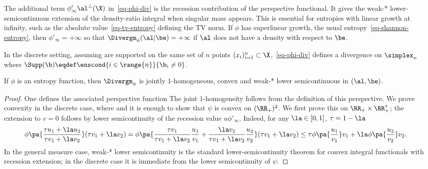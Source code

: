The additional term $\phi'_\infty \al^{\perp}(\X)$ in~\eqref{eq-phi-div} is the recession contribution of the perspective functional. It gives the weak-* lower-semicontinuous extension of the density-ratio integral when singular mass appears. This is essential for entropies with linear growth at infinity, such as the absolute value~\eqref{eq-tv-entropy} defining the TV norm. If $\phi$ has superlinear growth, \eg the usual entropy~\eqref{eq-shannon-entropy}, then $\phi'_\infty=+\infty$ so that $\Divergm_\phi (\al|\be) = +\infty$ if $\al$ does not have a density with respect to $\be$.

In the discrete setting, assuming
are supported on the same set of $n$ points $(x_i)_{i=1}^n \subset \X$,~\eqref{eq-phi-div} defines a divergence on $\simplex_n$
where $\Supp(\b) \eqdef \enscond{i \in \range{n}}{ \b_i \neq 0 }$.


\begin{proposition}
If $\phi$ is an entropy function, then $\Divergm_\phi$ is jointly $1$-homogeneous, convex and weak-* lower semicontinuous in $(\al,\be)$.
\end{proposition}

\begin{proof}
	One defines the associated perspective function
		The joint $1$-homogeneity follows from the definition of this perspective. We prove convexity in the discrete case, where
		and it is enough to show that $\psi$ is convex on $(\RR_+)^2$. We first prove this on $\RR_+ \times \RR_+^*$; the extension to $v=0$ follows by lower semicontinuity of the recession value $u\phi'_\infty$.
		Indeed, for any $\la \in [0,1]$, $\tau=1-\la$
	\begin{align*}
		\phi\pa{ \frac{\tau u_1 + \la u_2}{\tau v_1 + \la v_2} }
		(\tau v_1 + \la v_2)
		=
		\phi\pa{
				\frac{\tau v_1 }{\tau v_1 + \la v_2} \frac{u_1}{v_1}+
				\frac{\la v_2 }{\tau v_1 + \la v_2} \frac{u_2}{v_2}
		}
		(\tau v_1 + \la v_2)
		\leq
		\tau \phi\pa{\frac{u_1}{v_1}} v_1
		+
		\la \phi\pa{\frac{u_2}{v_2}} v_2 .
		\end{align*}
		In the general measure case, weak-* lower semicontinuity is the standard lower-semicontinuity theorem for convex integral functionals with recession extension; in the discrete case it is immediate from the lower semicontinuity of $\psi$.
\end{proof}

